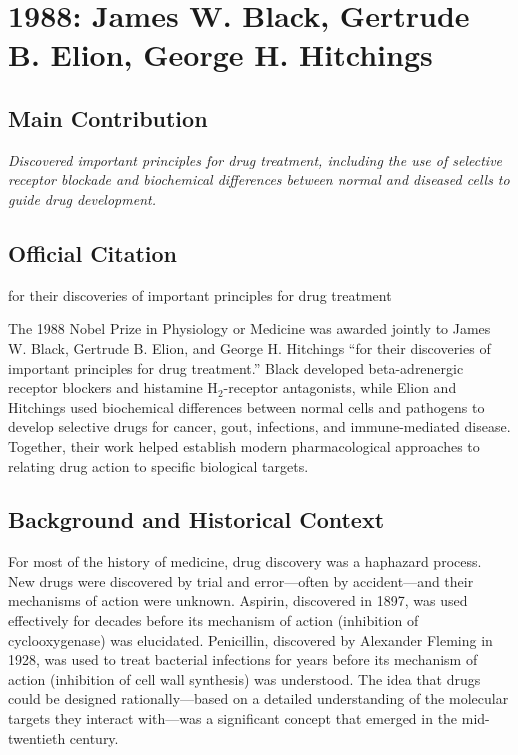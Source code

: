 \chapter[1988 --- Black et al.]{1988: James W. Black, Gertrude B. Elion, George H. Hitchings}
\label{ch:1988_Black}

\section*{Main Contribution}

\textit{Discovered important principles for drug treatment, including the use of selective receptor blockade and biochemical differences between normal and diseased cells to guide drug development.}\cite{nobel-1988,lecture-1988}

\section{Official Citation}

for their discoveries of important principles for drug treatment

The 1988 Nobel Prize in Physiology or Medicine was awarded jointly to James W. Black, Gertrude B. Elion, and George H. Hitchings ``for their discoveries of important principles for drug treatment.'' Black developed beta-adrenergic receptor blockers and histamine H$_2$-receptor antagonists, while Elion and Hitchings used biochemical differences between normal cells and pathogens to develop selective drugs for cancer, gout, infections, and immune-mediated disease. Together, their work helped establish modern pharmacological approaches to relating drug action to specific biological targets.

\section{Background and Historical Context}

For most of the history of medicine, drug discovery was a haphazard process. New drugs were discovered by trial and error---often by accident---and their mechanisms of action were unknown. Aspirin, discovered in 1897, was used effectively for decades before its mechanism of action (inhibition of cyclooxygenase) was elucidated. Penicillin, discovered by Alexander Fleming in 1928, was used to treat bacterial infections for years before its mechanism of action (inhibition of cell wall synthesis) was understood. The idea that drugs could be designed rationally---based on a detailed understanding of the molecular targets they interact with---was a significant concept that emerged in the mid-twentieth century.

